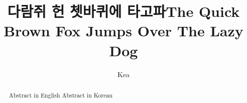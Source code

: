 \documentclass[master,english,final,pdfdoc]{PKNU-thesis}
\title[korean]{다람쥐 헌 쳇바퀴에 타고파}
\title[english]{The Quick Brown Fox Jumps Over The Lazy Dog}
\author[korean]{}{}
\author[english]{Kea}{Kimleang}
\renewcommand{\thesection}{\arabic{section}}
\begin{document}
 

    \makecontents

    \begin{abstract}
        {
            Abstract in English
        }
        {
            Abstract in Korean
        }
    \end{abstract}


	
	
	
	
	
	

    \printbibliography

\end{document}
